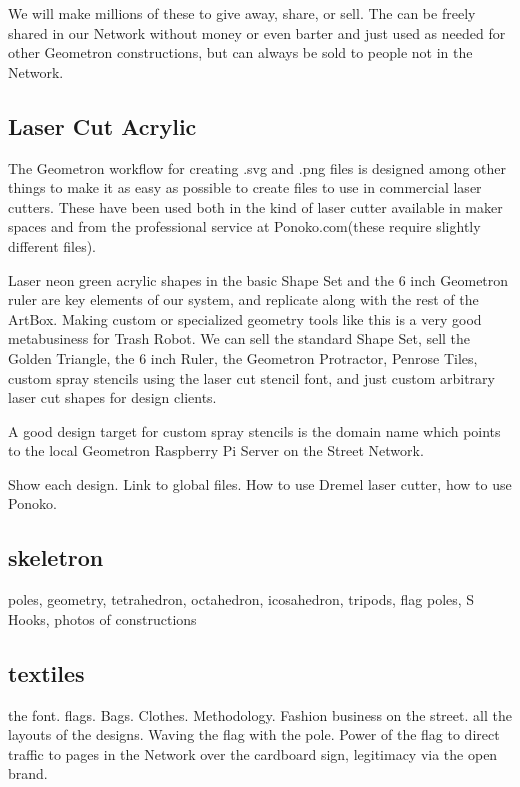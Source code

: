 We will make millions of these to give away, share, or sell.  The can be freely shared in our Network without money or even barter and just used as needed for other Geometron constructions, but can always be sold to people not in the Network.

\subsection{Laser Cut Acrylic}

The Geometron workflow for creating .svg and .png files is designed among other things to make it as easy as possible to create files to use in commercial laser cutters.  These have been used both in the kind of laser cutter available in maker spaces and from the professional service at Ponoko.com(these require slightly different files).  

Laser neon green acrylic shapes in the basic Shape Set and the 6 inch Geometron ruler are key elements of our system, and replicate along with the rest of the ArtBox.  Making custom or specialized geometry tools like this is a very good metabusiness for Trash Robot.  We can sell the standard Shape Set, sell the Golden Triangle, the 6 inch Ruler, the Geometron Protractor, Penrose Tiles, custom spray stencils using the laser cut stencil font, and just custom arbitrary laser cut shapes for design clients.  

A good design target for custom spray stencils is the domain name which points to the local Geometron Raspberry Pi Server on the Street Network. 


Show each design. Link to global files.  How to use Dremel laser cutter, how to use Ponoko.  

\subsection{skeletron}

poles, geometry, tetrahedron, octahedron, icosahedron, tripods, flag poles, S Hooks, photos of constructions

\subsection{textiles}

the font. flags. Bags. Clothes.  Methodology. Fashion business on the street. all the layouts of the designs.  Waving the flag with the pole. Power of the flag to direct traffic to pages in the Network over the cardboard sign, legitimacy via the open brand.

